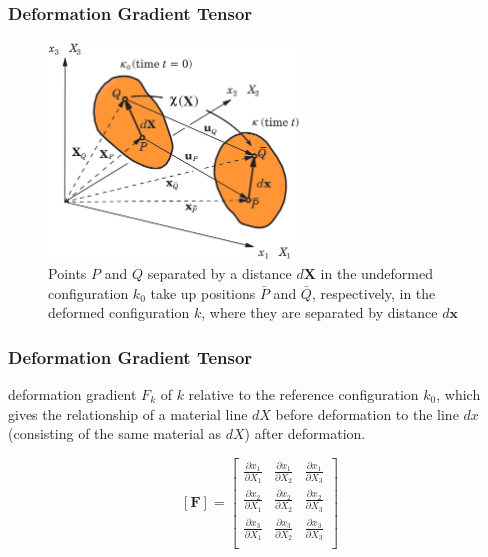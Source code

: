 \documentclass[notes]{beamer}
\begin{document}
\begin{frame}
\frametitle{Deformation Gradient Tensor}

\begin{figure}
	\includegraphics[width=0.6\textwidth]{figs/green-strain.png}
	\caption*{Points $P$ and $Q$ separated by a distance $d\mathbf{X}$ in the undeformed configuration $k_0$ take up positions $\bar{P}$ and $\bar{Q}$, respectively, in the deformed configuration $k$, where they are separated by distance $d\mathbf{x}$}
\end{figure}
\end{frame}

\begin{frame}
\frametitle{Deformation Gradient Tensor}

deformation gradient $F_k$ of $k$ relative to the reference configuration $k_0$, 
which gives the relationship of a material line $dX$ before deformation to the line $dx$ (consisting of the same material as $dX$) after deformation.

\begin{equation*}
	\left[\mathbf{F}\right] = 
	\begin{bmatrix}
		\frac{\partial x_1}{\partial X_1} & \frac{\partial x_1}{\partial X_2} & \frac{\partial x_1}{\partial X_3} \\
		\frac{\partial x_2}{\partial X_1} & \frac{\partial x_2}{\partial X_2} & \frac{\partial x_2}{\partial X_3} \\		\frac{\partial x_3}{\partial X_1} & \frac{\partial x_3}{\partial X_2} & \frac{\partial x_3}{\partial X_3} \\
	\end{bmatrix}
\end{equation*}
\end{frame}
\end{document}
